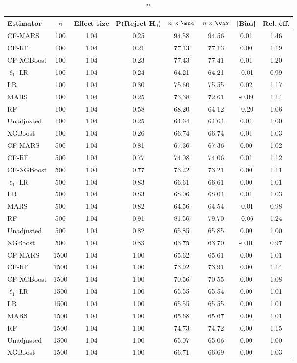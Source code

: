 \begin{table}
\centering
\caption{""}
\begin{tabular}{lccccccc}
\toprule
Estimator & $n$ & Effect size & P(Reject H$_0$) & $n\times\mse$ & $n\times \var$ & |Bias| & Rel. eff.\\ \midrule
CF-MARS & 100 & 1.04 & 0.25 & 94.58 & 94.56 &  0.01 & 1.46 \\ 
CF-RF & 100 & 1.04 & 0.21 & 77.13 & 77.13 &  0.00 & 1.19 \\ 
CF-XGBoost & 100 & 1.04 & 0.23 & 77.43 & 77.41 &  0.01 & 1.20 \\ 
$\ell_1$-LR & 100 & 1.04 & 0.24 & 64.21 & 64.21 & -0.01 & 0.99 \\ 
LR & 100 & 1.04 & 0.30 & 75.60 & 75.55 &  0.02 & 1.17 \\ 
MARS & 100 & 1.04 & 0.25 & 73.38 & 72.61 & -0.09 & 1.14 \\ 
RF & 100 & 1.04 & 0.58 & 68.20 & 64.12 & -0.20 & 1.06 \\ 
Unadjusted & 100 & 1.04 & 0.25 & 64.64 & 64.64 &  0.01 & 1.00 \\ 
XGBoost & 100 & 1.04 & 0.26 & 66.74 & 66.74 &  0.01 & 1.03 \\ \addlinespace 
CF-MARS & 500 & 1.04 & 0.81 & 67.36 & 67.36 &  0.00 & 1.02 \\ 
CF-RF & 500 & 1.04 & 0.77 & 74.08 & 74.06 &  0.01 & 1.12 \\ 
CF-XGBoost & 500 & 1.04 & 0.77 & 73.22 & 73.21 &  0.00 & 1.11 \\ 
$\ell_1$-LR & 500 & 1.04 & 0.83 & 66.61 & 66.61 &  0.00 & 1.01 \\ 
LR & 500 & 1.04 & 0.83 & 68.06 & 68.04 &  0.01 & 1.03 \\ 
MARS & 500 & 1.04 & 0.82 & 64.56 & 64.54 & -0.01 & 0.98 \\ 
RF & 500 & 1.04 & 0.91 & 81.56 & 79.70 & -0.06 & 1.24 \\ 
Unadjusted & 500 & 1.04 & 0.82 & 65.85 & 65.85 &  0.00 & 1.00 \\ 
XGBoost & 500 & 1.04 & 0.83 & 63.75 & 63.70 & -0.01 & 0.97 \\ \addlinespace 
CF-MARS & 1500 & 1.04 & 1.00 & 65.62 & 65.61 &  0.00 & 1.01 \\ 
CF-RF & 1500 & 1.04 & 1.00 & 73.92 & 73.91 &  0.00 & 1.14 \\ 
CF-XGBoost & 1500 & 1.04 & 1.00 & 70.56 & 70.55 &  0.00 & 1.08 \\ 
$\ell_1$-LR & 1500 & 1.04 & 1.00 & 65.55 & 65.54 &  0.00 & 1.01 \\ 
LR & 1500 & 1.04 & 1.00 & 65.55 & 65.55 &  0.00 & 1.01 \\ 
MARS & 1500 & 1.04 & 1.00 & 65.68 & 65.67 &  0.00 & 1.01 \\ 
RF & 1500 & 1.04 & 1.00 & 74.73 & 74.72 &  0.00 & 1.15 \\ 
Unadjusted & 1500 & 1.04 & 1.00 & 65.07 & 65.06 &  0.00 & 1.00 \\ 
XGBoost & 1500 & 1.04 & 1.00 & 66.71 & 66.69 &  0.00 & 1.03 \\
\bottomrule
\end{tabular}
\end{table}

